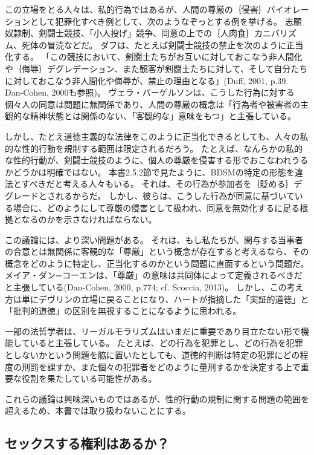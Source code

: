 \documentclass[paper=a4,book,openany]{jlreq}
\newcommand{\ig}[1]{}           %
\begin{document}
この立場をとる人々は、私的行為ではあるが、人間の尊厳の｛侵害｝{バイオレーション}として犯罪化すべき例として、次のようなぞっとする例を挙げる。
志願奴隷制、剣闘士競技、「小人投げ」競争、同意の上での｛人肉食｝{カニバリズム}、死体の冒涜などだ。
ダフは、たとえば剣闘士競技の禁止を次のように正当化する。
「この競技において、剣闘士たちがお互いに対しておこなう非人間化や｛侮辱｝{デグレデーション}、また観客が剣闘士たちに対して、そして自分たちに対しておこなう非人間化や侮辱が、禁止の理由となる」(Duff, 2001, p.39. Dan-Cohen, 2000も参照)。
ヴェラ・バーゲルソンは、こうした行為に対する個々人の同意は問題に無関係であり、人間の尊厳の概念は「行為者や被害者の主観的な精神状態とは関係のない、「客観的な」意味をもつ」と主張している\citep[p.217]{bergelson07:_right_be_hurt}。

しかし、たとえ道徳主義的な法律をこのように正当化できるとしても、人々の私的な性的行動を規制する範囲は限定されるだろう。
たとえば、なんらかの私的な性的行動が、剣闘士競技のように、個人の尊厳を侵害する形でおこなわれうるかどうかは明確ではない。
本書2.5.2節で見たように、BDSMの特定の形態を違法とすべきだと考える人々もいる。
それは、その行為が参加者を｛貶める｝{デグレード}とされるからだ。
しかし、彼らは、こうした行為が同意に基づいている場合に、どのようにして尊厳の侵害として扱われ、同意を無効化するに足る根拠となるのかを示さなければならない。

この議論には、より深い問題がある。
それは、もし私たちが、関与する当事者の合意とは無関係に客観的な「尊厳」という概念が存在すると考えるなら、その概念をどのように特定し、正当化するのかという問題に直面するという問題だ。
メイア・ダン=コーエンは、「尊厳」の意味は共同体によって定義されるべきだと主張している(Dan-Cohen, 2000, p.774; cf. Scoccia, 2013)。
\nocite{scoccia13:_in_defen_pure_legal_moral}\nocite{dan-cohen00:_basic_values_victim_state_mind}
しかし、この考え方は単にデヴリン\ig{Patrick Devlin}の立場に戻ることになり、ハートが指摘した「実証的道徳」と「批判的道徳」の区別を無視することになるように思われる。

一部の法哲学者は、リーガルモラリズムはいまだに重要であり目立たない形で機能していると主張している。
たとえば、どの行為を犯罪とし、どの行為を犯罪としないかという問題を脇に置いたとしても、道徳的判断は特定の犯罪にどの程度の刑罰を課すか、また個々の犯罪者をどのように量刑するかを決定する上で重要な役割を果たしている可能性がある\citep[cf.][]{ristroph11:_third_wave_legal_moral}。

これらの議論は興味深いものではあるが、性的行動の規制に関する問題の範囲を超えるため、本書では取り扱わないことにする。

\subsection{セックスする権利はあるか？}
\end{document}
